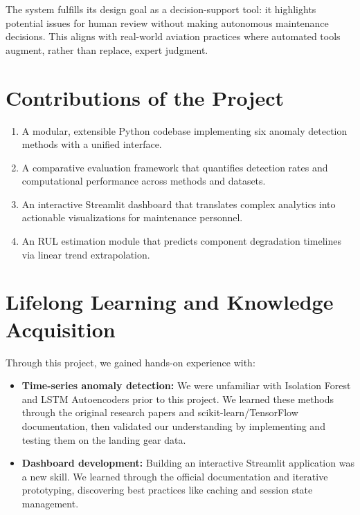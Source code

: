 \documentclass{CLS_zhou430}
\begin{document}
The system fulfills its design goal as a decision-support tool: it highlights potential issues for human review without making autonomous maintenance decisions. This aligns with real-world aviation practices where automated tools augment, rather than replace, expert judgment.

\section{Contributions of the Project}
\begin{enumerate}
    \item A modular, extensible Python codebase implementing six anomaly detection methods with a unified interface.
    \item A comparative evaluation framework that quantifies detection rates and computational performance across methods and datasets.
    \item An interactive Streamlit dashboard that translates complex analytics into actionable visualizations for maintenance personnel.
    \item An RUL estimation module that predicts component degradation timelines via linear trend extrapolation.
\end{enumerate}

\section{Lifelong Learning and Knowledge Acquisition}
Through this project, we gained hands-on experience with:
\begin{itemize}
    \item \textbf{Time-series anomaly detection:} We were unfamiliar with Isolation Forest and LSTM Autoencoders prior to this project. We learned these methods through the original research papers \cite{liu2008isolation, malhotra2016lstm} and scikit-learn/TensorFlow documentation, then validated our understanding by implementing and testing them on the landing gear data.
    \item \textbf{Dashboard development:} Building an interactive Streamlit application was a new skill. We learned through the official documentation and iterative prototyping, discovering best practices like caching and session state management.
\end{itemize}
\end{document}
